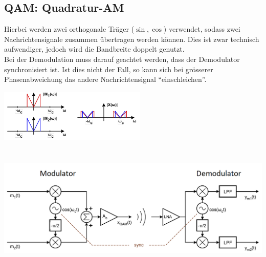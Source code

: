 \subsection{QAM: Quadratur-AM}
	\begin{minipage}{12cm}
		Hierbei werden zwei orthogonale Träger ($\sin, \cos$) verwendet, sodass zwei Nachrichtensignale zusammen übertragen werden können. Dies ist zwar technisch aufwendiger, jedoch wird die Bandbreite doppelt genutzt. \\
		Bei der Demodulation muss darauf geachtet werden, dass der Demodulator synchronisiert ist. Ist dies nicht der Fall, so kann sich bei grösserer Phasenabweichung das andere Nachrichtensignal ``einschleichen''.
	\end{minipage}
	\begin{minipage}{7cm}
		\includegraphics[width=7cm]{bilder/am_qam_spektrum.png}
	\end{minipage}
	\begin{center}
    	\includegraphics[height=6cm]{bilder/QAM_ModulatorDemodulator.png}
	\end{center}
